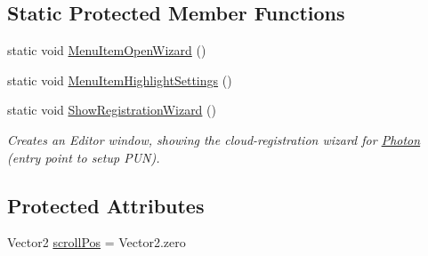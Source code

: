 \subsection*{Static Protected Member Functions}
\begin{DoxyCompactItemize}
\item 
static void \hyperlink{class_photon_editor_a86bf73b728f6a806a228d940ead16b4c}{Menu\+Item\+Open\+Wizard} ()
\item 
static void \hyperlink{class_photon_editor_a689f6bb781fe29abe03e215b2b9b0f5f}{Menu\+Item\+Highlight\+Settings} ()
\item 
static void \hyperlink{class_photon_editor_ad09432c402050476d88efc81e81f7595}{Show\+Registration\+Wizard} ()
\begin{DoxyCompactList}\small\item\em Creates an Editor window, showing the cloud-\/registration wizard for \hyperlink{namespace_photon}{Photon} (entry point to setup P\+UN).\end{DoxyCompactList}\end{DoxyCompactItemize}
\subsection*{Protected Attributes}
\begin{DoxyCompactItemize}
\item 
Vector2 \hyperlink{class_photon_editor_a5229df5b774975987fb48246d81e37aa}{scroll\+Pos} = Vector2.\+zero
\end{DoxyCompactItemize}
